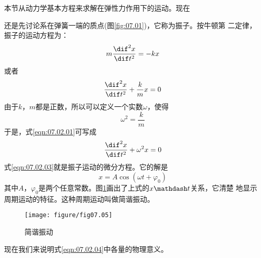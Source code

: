 \documentclass[../outline-of-mechanics.tex]{subfiles}
\begin{document}
\section[振动解]{}\label{sec:07.02}

本节从动力学基本方程来求解在弹性力作用下的运动。现在

\noindent
还是先讨论系在弹簧一端的质点(图\ref{fig:07.01})，它称为振子。按牛顿第
二定律，振子的运动方程为：
\begin{equation*}
  m \frac { \dif ^ { 2 } x } { \dif t ^ { 2 } } = - k x
\end{equation*}
或者
\begin{equation}\label{eqn:07.02.01}
  \frac { \dif ^ { 2 } x } { \dif t ^ { 2 } } + \frac { k } { m } x = 0
\end{equation}
由于$ k $，$ m $都是正数，所以可以定义一个实数$ \omega $，使得
\begin{equation}\label{eqn:07.02.02}
  \omega ^ { 2 } = \frac { k } { m }
\end{equation}
于是，式\eqref{eqn:07.02.01}可写成
\begin{equation}\label{eqn:07.02.03}
  \frac { \dif ^ { 2 } x } { \dif t ^ { 2 } } + \omega ^ { 2 } x = 0
\end{equation}
式\eqref{eqn:07.02.03}就是振子运动的微分方程。它的解是
\begin{equation}\label{eqn:07.02.04}
  x = A \cos \left( \omega t + \varphi _ { 0 } \right)
\end{equation}
其中$ A $，$ \varphi _ { 0 } $是两个任意常数。图\ref{fig:07.05}\;画出了上式的$ x \mathdash t $关系，它清楚
地显示周期运动的特征。这种周期运动叫做简谐振动。
\begin{figure}[h]
  \vspace{1em}
  \centering
  \texttt{[image: figure/fig07.05]}
  \caption{简谐振动}
  \label{fig:07.05}
\end{figure}

现在我们来说明式\eqref{eqn:07.02.04}中各量的物理意义。
\end{document}
